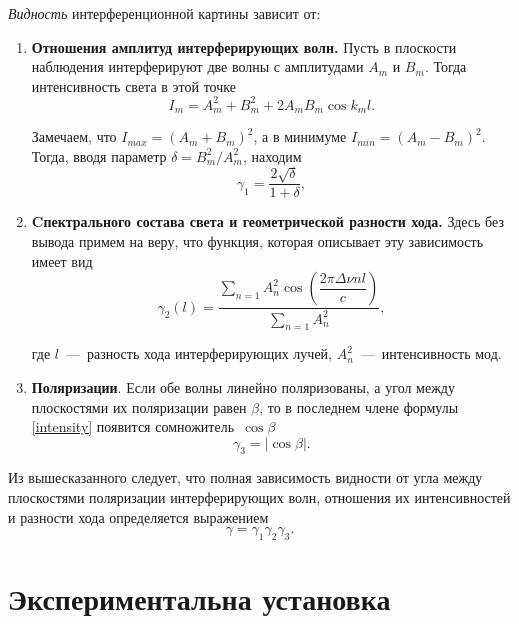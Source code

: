 \documentclass{MagicLabs}
\begin{document}
\textit{Видность }интерференционной картины  зависит от:
\begin{enumerate}
	\item \textbf{Отношения амплитуд интерферирующих волн.}
	Пусть в плоскости наблюдения интерферируют 
	две волны с амплитудами $ A_m $ и $ B_m $. Тогда интенсивность света в этой точке
	\begin{equation}\label{intensity}
	I_m = A^2_m + B^2_m + 2A_mB_m\cos{k_ml}.
	\end{equation}
	
	Замечаем, что $ I_{max} = (A_m + B_m)^2 $, а в минимуме 
	$ I_{min} = (A_m - B_m)^2 $. Тогда, вводя параметр $  \delta = B_m^2/A_m^2 $, находим
	\begin{equation}\label{visibility1}
		\gamma_1 = \dfrac{2\sqrt{\delta}}{1 + \delta},
	\end{equation}	
	
	\item \textbf{Cпектрального состава света и геометрической разности хода.} 
	Здесь без вывода примем на веру, что функция,
	которая описывает эту зависимость имеет вид
	\begin{equation}\label{visibility2}
		\gamma_2(l) = \dfrac{\displaystyle \sum_{n=1}A_n^2\cos{\left(\dfrac{2\pi\Delta\nu nl}{c}\right)}}
										{\displaystyle \sum_{n=1}A_n^2},
	\end{equation}
	
	где $ l $~---~разность хода интерферирующих лучей, $ A_n^2 $~---~интенсивность мод.
	
	\item \textbf{Поляризации}. Если обе волны линейно поляризованы, а угол между 
	плоскостями их поляризации равен $ \beta $, то в последнем члене формулы \ref{intensity} появится сомножитель~$ \cos\beta $
	\begin{equation}\label{visibility3}
		\gamma_3 = |\cos\beta|.
	\end{equation}
\end{enumerate}


Из вышесказанного следует, что полная зависимость видности от угла между плоскостями поляризации интерферирующих волн, отношения их интенсивностей и разности хода определяется выражением
\begin{equation}\label{visibility}
	\gamma = \gamma_1\gamma_2\gamma_3.
\end{equation}
\newpage
\section{Экспериментальна установка}
\end{document}
